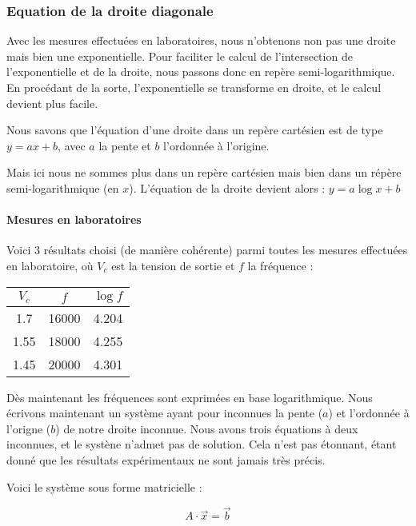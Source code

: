 \subsubsection{Equation de la droite diagonale}

Avec les mesures effectuées en laboratoires, nous n'obtenons non pas une droite mais bien une exponentielle. Pour faciliter le calcul de l'intersection de l'exponentielle et de la droite, nous passons donc en repère semi-logarithmique. En procédant de la sorte, l'exponentielle se transforme en droite, et le calcul devient plus facile.

Nous savons que l'équation d'une droite dans un repère cartésien est de type $y=ax+b$, avec $a$ la pente et $b$ l'ordonnée à l'origine.

Mais ici nous ne sommes plus dans un repère cartésien mais bien dans un répère semi-logarithmique (en $x$). L'équation de la droite devient alors : $y=a\log{x}+b$

\paragraph{Mesures en laboratoires}

Voici 3 résultats choisi (de manière cohérente) parmi toutes les mesures effectuées en laboratoire, où $V_c$ est la tension de sortie et $f$ la fréquence :

\begin{center}
	\begin{tabular}{|c|c|c|}
		\hline
		$V_c$ & $f$ & $\log{f}$ \\
		\hline
		1.7 & 16000 & 4.204 \\
		\hline
		1.55 & 18000 & 4.255 \\
		\hline
		1.45 & 20000 & 4.301 \\
		\hline
	\end{tabular}
\end{center}

Dès maintenant les fréquences sont exprimées en base logarithmique.
Nous écrivons maintenant un système ayant pour inconnues la pente ($a$) et l'ordonnée à l'origne ($b$) de notre droite inconnue. 
Nous avons trois équations à deux inconnues, et le systène n'admet pas de solution. 
Cela n'est pas étonnant, étant donné que les résultats expérimentaux ne sont jamais très précis.

Voici le système sous forme matricielle :

$$A \cdot \vec{x} = \vec{b}$$

